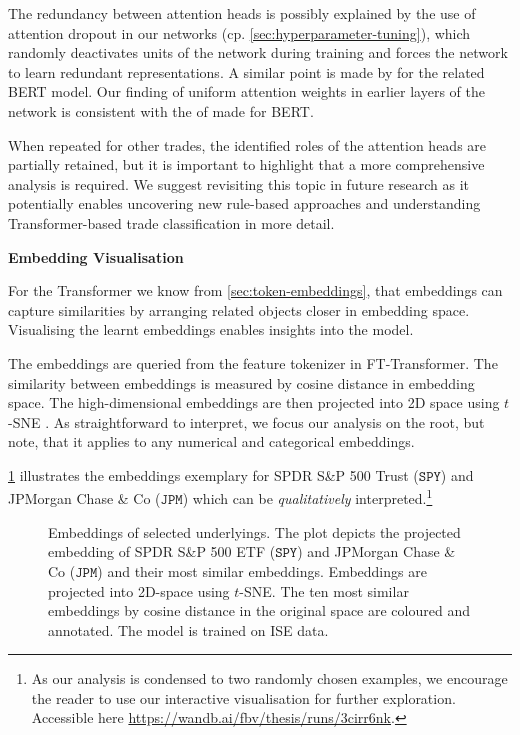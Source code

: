 The redundancy between attention heads is possibly explained by the use of attention dropout in our networks (cp. \cref{sec:hyperparameter-tuning}), which randomly deactivates units of the network during training and forces the network to learn redundant representations. A similar point is made by \textcite[][8--9]{clarkWhatDoesBERT2019} for the related \gls{BERT} model. Our finding of uniform attention weights in earlier layers of the network is consistent with the of \textcite[][4]{abnarQuantifyingAttentionFlow2020} made for \gls{BERT}.

When repeated for other trades, the identified roles of the attention heads are partially retained, but it is important to highlight that a more comprehensive analysis is required. We suggest revisiting this topic in future research as it potentially enables uncovering new rule-based approaches and understanding Transformer-based trade classification in more detail.

\textbf{Embedding Visualisation}

For the Transformer we know from \cref{sec:token-embeddings}, that embeddings can capture similarities by arranging related objects closer in embedding space. Visualising the learnt embeddings enables insights into the model.

The embeddings are queried from the feature tokenizer in FT-Transformer. The similarity between embeddings is measured by cosine distance in embedding space. The high-dimensional embeddings are then projected into 2D space using $t$-SNE \autocite[][2587]{vandermaatenVisualizingDataUsing2008}. As straightforward to interpret, we focus our analysis on the root, but note, that it applies to any numerical and categorical embeddings.

\cref{fig:categorical-embeddings} illustrates the embeddings exemplary for SPDR S\&P 500 Trust ($\mathtt{SPY}$) and JPMorgan Chase \& Co ($\mathtt{JPM}$) which can be \emph{qualitatively} interpreted.\footnote{As our analysis is condensed to two randomly chosen examples, we encourage the reader to use our interactive visualisation for further exploration. Accessible here \url{https://wandb.ai/fbv/thesis/runs/3cirr6nk}.}

\begin{figure}[h!]
    \vfill
    \caption[Embeddings of Selected Underlyings]{Embeddings of selected underlyings. The plot depicts the projected embedding of SPDR S\&P 500 ETF ($\mathtt{SPY}$) and JPMorgan Chase \& Co ($\mathtt{JPM}$) and their most similar embeddings. Embeddings are projected into 2D-space using $t$-SNE. The ten most similar embeddings by cosine distance in the original space are coloured and annotated. The model is trained on \gls{ISE} data.}
    \label{fig:categorical-embeddings}
\end{figure}

